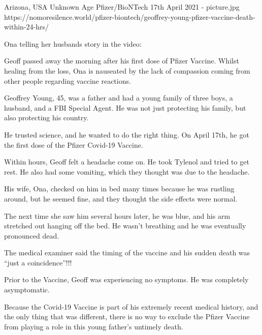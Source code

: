 {Arizona, USA}
{Unknown Age}
{Pfizer/BioNTech}
{17th April 2021}
{-}
{picture.jpg}
{https://nomoresilence.world/pfizer-biontech/geoffrey-young-pfizer-vaccine-death-within-24-hrs/}
{



Ona telling her husbands story in the video:

Geoff passed away the morning after his first dose of Pfizer Vaccine. Whilst healing from the loss, Ona is nauseated by the lack of compassion coming from other people regarding vaccine reactions.

Geoffrey Young, 45, was a father and had a young family of three boys, a husband, and a FBI Special Agent. He was not just protecting his family, but also protecting his country.

He trusted science, and he wanted to do the right thing. On April 17th, he got the first dose of the Pfizer Covid-19 Vaccine.

Within hours, Geoff felt a headache come on. He took Tylenol and tried to get rest. He also had some vomiting, which they thought was due to the headache.

His wife, Ona, checked on him in bed many times because he was rustling around, but he seemed fine, and they thought the side effects were normal.

The next time she saw him several hours later, he was blue, and his arm stretched out hanging off the bed. He wasn’t breathing and he was eventually pronounced dead.

The medical examiner said the timing of the vaccine and his sudden death was “just a coincidence”!!!

Prior to the Vaccine, Geoff was experiencing no symptoms. He was completely asymptomatic.

Because the Covid-19 Vaccine is part of his extremely recent medical history, and the only thing that was different, there is no way to exclude the Pfizer Vaccine from playing a role in this young father’s untimely death.
}
